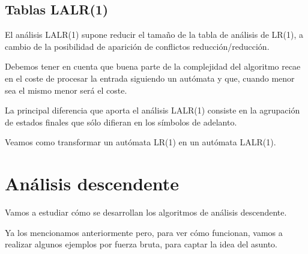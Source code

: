 \documentclass{apuntes}
\begin{document}
\subsection{Tablas LALR(1)}

El análisis LALR(1) supone reducir el tamaño de la tabla de análisis de LR(1), a cambio de la posibilidad de aparición de conflictos reducción/reducción.

Debemos tener en cuenta que buena parte de la complejidad del algoritmo recae en el coste de procesar la entrada siguiendo un autómata y que, cuando menor sea el mismo menor será el coste.

La principal diferencia que aporta el análisis LALR(1) consiste en la agrupación de estados finales que sólo difieran en los símbolos de adelanto.

Veamos como transformar un autómata LR(1) en un autómata LALR(1).

% 
% 



\section{Análisis descendente}
Vamos a estudiar cómo se desarrollan los algoritmos de análisis descendente.

Ya los mencionamos anteriormente pero, para ver cómo funcionan, vamos a realizar algunos ejemplos por fuerza bruta, para captar la idea del asunto.
\end{document}
